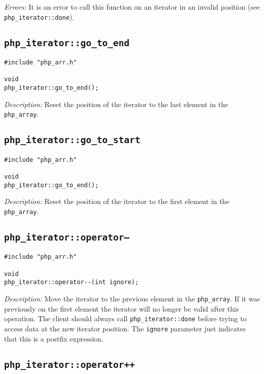 \documentclass[11pt,titlepage]{article}
\begin{document}
\emph{Errors:} It is an error to call this function on an iterator in an invalid position (see \verb|php_iterator::done|).


\subsection{\texttt{php\_iterator::go\_to\_end}}

\begin{verbatim}
#include "php_arr.h"

void 
php_iterator::go_to_end();
\end{verbatim}

\emph{Description:} Reset the position of the iterator to the last element in the \verb|php_array|.


\subsection{\texttt{php\_iterator::go\_to\_start}}

\begin{verbatim}
#include "php_arr.h"

void 
php_iterator::go_to_end();
\end{verbatim}

\emph{Description:} Reset the position of the iterator to the first element in the \verb|php_array|.


\subsection{\texttt{php\_iterator::operator--}}

\begin{verbatim}
#include "php_arr.h"

void 
php_iterator::operator--(int ignore);
\end{verbatim}

\emph{Description:} Move the iterator to the previous element in the \verb|php_array|. If it was previously on the first element the iterator will no longer be valid after this operation. The client should always call \verb|php_iterator::done| before trying to access data at the new iterator position. The \verb|ignore| parameter just indicates that this is a postfix expression.


\subsection{\texttt{php\_iterator::operator++}}
\end{document}
